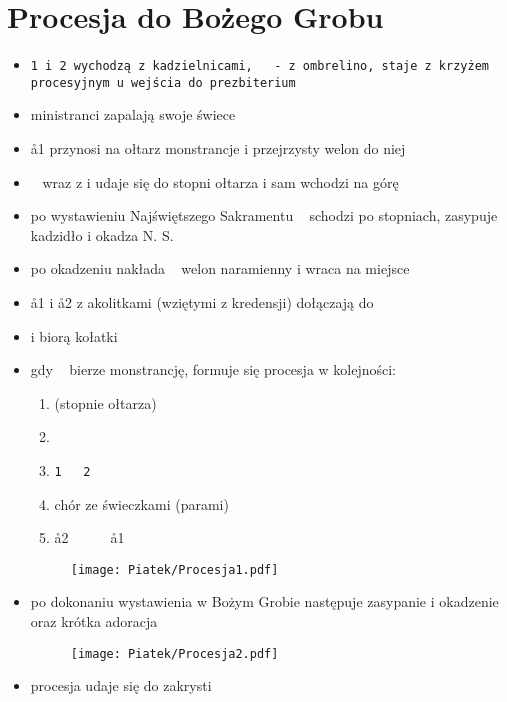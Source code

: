 \section{Procesja do Bożego Grobu}

\begin{itemize}
	\item \tt1 i \tt2 wychodzą z kadzielnicami, \oo~ - z ombrelino, 
	      staje z krzyżem procesyjnym u wejścia do prezbiterium
	\item ministranci zapalają swoje świece
	\item \aa1 przynosi na ołtarz monstrancje i przejrzysty welon do niej
	\item \ii~ wraz z  i  udaje się do stopni ołtarza i sam wchodzi na
	      górę
	\item po wystawieniu Najświętszego Sakramentu \ii~ schodzi po stopniach,
	      zasypuje kadzidło i okadza N. S.
	\item po okadzeniu  nakłada \ii~ welon naramienny i wraca na miejsce
	\item \aa1 i \aa2 z akolitkami (wziętymi z kredensji) dołączają do 
	\item {} i  biorą kołatki
	\item gdy \ii~ bierze monstrancję, formuje się procesja w kolejności:

	      \begin{enumerate}\centering
		      \item[] (stopnie ołtarza)
		      \item[] ~~~\ii~~~~\oo~~~~
		      \item[] \tt1~~~\tt2
		      \item[] chór ze świeczkami (parami)
		      \item[] \aa2~~~~~~\aa1
	      \end{enumerate}

	      \newpage

	      \begin{figure}[h]
		      \centering
		      \texttt{[image: Piatek/Procesja1.pdf]}
	      \end{figure}

	\item po dokonaniu wystawienia w Bożym Grobie następuje zasypanie i
	      okadzenie oraz krótka adoracja

	      \begin{figure}[h]
		      \centering
		      \texttt{[image: Piatek/Procesja2.pdf]}
	      \end{figure}

	\item procesja udaje się do zakrysti
\end{itemize}

